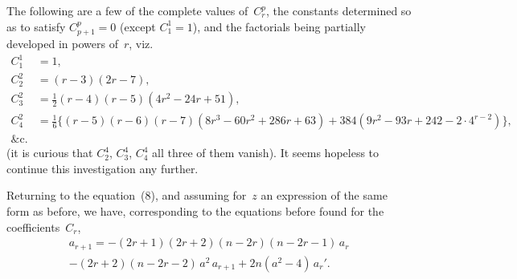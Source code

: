 \documentclass[11pt,a4paper]{book}
\begin{document}
The following are a few of the complete values of~$C_r^p$, the constants determined so as to satisfy $C_{p+1}^p = 0$ (except $C_1^1 = 1$), and the factorials being partially developed in powers of~$r$, viz.
\begin{align*}
C_1^1 &= 1,\\
C_2^2 &= (r-3)(2r-7),\\
C_3^2 &= \tfrac{1}{2}(r-4)(r-5)(4r^2 - 24r + 51),\\
C_4^2 &= \tfrac{1}{6}\{(r-5)(r-6)(r-7)(8r^3 - 60r^2 + 286r + 63) + 384(9r^2 - 93r + 242 - 2 \cdot 4^{r-2})\},\\
\&\text{c.}
\end{align*}
(it is curious that $C_2^4$, $C_3^4$, $C_4^4$ all three of them vanish). It seems hopeless to continue this investigation any further.

Returning to the equation~(8), and assuming for~$z$ an expression of the same form as before, we have, corresponding to the equations before found for the coefficients~$C_r$,
\begin{multline*}
a_{r+1} = -(2r+1)(2r+2)(n-2r)(n-2r-1)\,a_r \\
- (2r+2)(n-2r-2)\,a^2\,a_{r+1} + 2n(a^2-4)\,a_r'.
\end{multline*}
\end{document}
